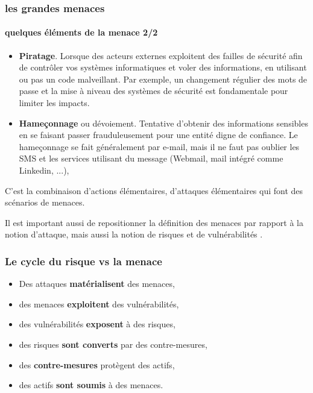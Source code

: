 \begin{frame}
\frametitle<presentation>{les grandes menaces}
\framesubtitle<presentation>{quelques éléments de la menace 2/2}
\begin{itemize}

\item \textbf{Piratage}. Lorsque des acteurs externes exploitent des failles de sécurité afin de contrôler vos systèmes informatiques et voler des informations, en utilisant ou pas un code malveillant. Par exemple, un changement régulier des mots de passe et la mise à niveau des systèmes de sécurité est fondamentale pour limiter les impacts.

\item \textbf{Hameçonnage} ou dévoiement. Tentative d’obtenir des informations sensibles en se faisant passer frauduleusement pour une entité digne de confiance. Le hameçonnage se fait généralement par e-mail, mais il ne faut pas oublier les SMS et les services utilisant du message (Webmail, mail intégré comme Linkedin, ...), 
\end{itemize}
\end{frame}

C'est la combinaison d'actions élémentaires, d'attaques élémentaires qui font des scénarios de menaces. 

Il est important aussi de repositionner la définition des menaces par rapport à la notion d'attaque, mais aussi la notion de risques et de vulnérabilités .



\begin{frame}
\frametitle<presentation>{Le cycle du risque vs la menace}
\end{frame}
\begin{itemize}
  \item Des attaques \textbf{matérialisent} des menaces,
  \item des menaces \textbf{exploitent} des vulnérabilités,
  \item des vulnérabilités \textbf{exposent} à des risques,
  \item des risques\textbf{ sont converts }par des contre-mesures,
  \item des \textbf{contre-mesures }protègent des actifs,
  \item des actifs \textbf{sont  soumis }à  des menaces.
\end{itemize}

